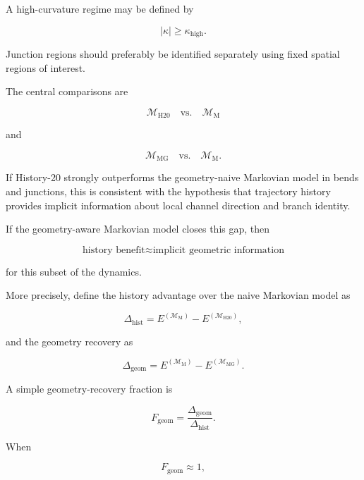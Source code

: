 \documentclass[11pt]{article}
\newcommand{\Mhist}{\mathcal{M}_{\mathrm{H20}}}
\newcommand{\Mmark}{\mathcal{M}_{\mathrm{M}}}
\newcommand{\Mgeom}{\mathcal{M}_{\mathrm{MG}}}
\begin{document}
A high-curvature regime may be defined by

\begin{equation}
|\kappa|
\ge
\kappa_{\mathrm{high}}.
\end{equation}

Junction regions should preferably be identified separately using fixed spatial regions of interest.

The central comparisons are

\begin{equation}
\Mhist
\quad \text{vs.} \quad
\Mmark
\end{equation}

and

\begin{equation}
\Mgeom
\quad \text{vs.} \quad
\Mmark.
\end{equation}

If History-20 strongly outperforms the geometry-naive Markovian model in bends and junctions, this is consistent with the hypothesis that trajectory history provides implicit information about local channel direction and branch identity.

If the geometry-aware Markovian model closes this gap, then

\begin{equation}
\text{history benefit}
\approx
\text{implicit geometric information}
\end{equation}

for this subset of the dynamics.

More precisely, define the history advantage over the naive Markovian model as

\begin{equation}
\Delta_{\mathrm{hist}}
=
E^{(\Mmark)}
-
E^{(\Mhist)},
\end{equation}

and the geometry recovery as

\begin{equation}
\Delta_{\mathrm{geom}}
=
E^{(\Mmark)}
-
E^{(\Mgeom)}.
\end{equation}

A simple geometry-recovery fraction is

\begin{equation}
F_{\mathrm{geom}}
=
\frac{
\Delta_{\mathrm{geom}}
}{
\Delta_{\mathrm{hist}}
}.
\end{equation}

When

\begin{equation}
F_{\mathrm{geom}}\approx 1,
\end{equation}
\end{document}

